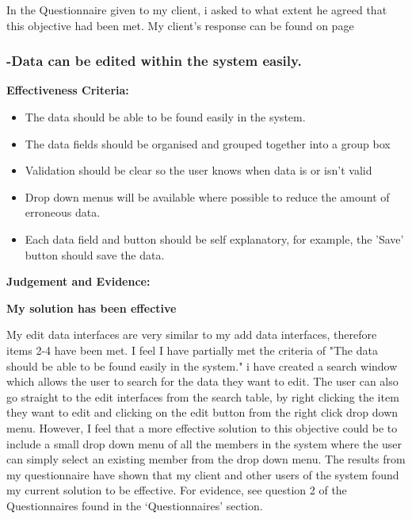 In the Questionnaire given to my client, i asked to what extent he agreed that this objective had been met. My client's response can be found on page 




\pagebreak
\subsubsection{-Data can be edited within the system easily.}

\textbf{Effectiveness Criteria:}\newline
\begin{itemize}
	\item{The data should be able to be found easily in the system.}
	\item{The data fields should be organised and grouped together into a group box}
	\item{Validation should be clear so the user knows when data is or isn't valid}
	\item{Drop down menus will be available where possible to reduce the amount of erroneous data.}
	\item{Each data field and button should be self explanatory, for example, the 'Save' button should save the data.}
\end{itemize}

\textbf{Judgement and Evidence:} \newline

\textbf{\large{My solution has been effective}}

 My edit data interfaces are very similar to my add data interfaces, therefore items 2-4 have been met. I feel I have partially met the criteria of "The data should be able to be found easily in the system." i have created a search window which allows the user to search for the data they want to edit. The user can also go straight to the edit interfaces from the search table, by right clicking the item they want to edit and clicking on the edit button from the right click drop down menu. However, I feel that a more effective solution to this objective could be to include a small drop down menu of all the members in the system where the user can simply select an existing member from the drop down menu. The results from my questionnaire have shown that my client and other users of the system found my current solution to be effective. For evidence, see question 2 of the Questionnaires found in the `Questionnaires' section.





